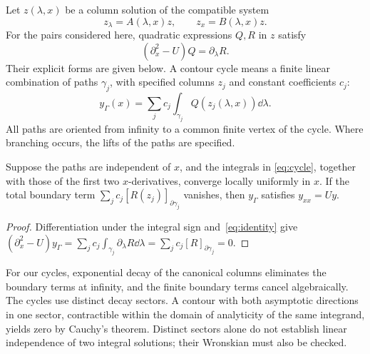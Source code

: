 Let $z(\lambda,x)$ be a column solution of the compatible system
\begin{equation*}
 z_\lambda=A(\lambda,x)z,\qquad z_x=B(\lambda,x)z.
\end{equation*}
For the pairs considered here, quadratic expressions $Q,R$ in $z$ satisfy
\begin{equation}\label{eq:identity}
 (\partial_x^2-U)Q=\partial_\lambda R.
\end{equation}
Their explicit forms are given below. A contour cycle means a finite
linear combination of paths $\gamma_j$, with specified columns $z_j$
and constant coefficients $c_j$:
\begin{equation}\label{eq:cycle}
 y_\Gamma(x)=\sum_j c_j\int_{\gamma_j}Q(z_j(\lambda,x))\dd\lambda.
\end{equation}
All paths are oriented from infinity to a common finite vertex of the
cycle. Where branching occurs, the lifts of the paths are specified.

\begin{proposition}\label{prop:cycle}
Suppose the paths are independent of $x$, and the integrals in
\eqref{eq:cycle}, together with those of the first two $x$-derivatives,
converge locally uniformly in $x$. If the total boundary term
$\sum_jc_j[R(z_j)]_{\partial\gamma_j}$ vanishes, then $y_\Gamma$
satisfies $y_{xx}=Uy$.
\end{proposition}
\begin{proof}
Differentiation under the integral sign and~\eqref{eq:identity} give
$(\partial_x^2-U)y_\Gamma=
\sum_jc_j\int_{\gamma_j}\partial_\lambda R\dd\lambda
=\sum_jc_j[R]_{\partial\gamma_j}=0$.
\end{proof}

For our cycles, exponential decay of the canonical columns eliminates
the boundary terms at infinity, and the finite boundary terms cancel
algebraically. The cycles use distinct decay sectors. A contour with both
asymptotic directions in one sector, contractible within the domain of
analyticity of the same integrand, yields zero by Cauchy's theorem.
Distinct sectors alone do not establish linear independence of two
integral solutions; their Wronskian must also be checked.


